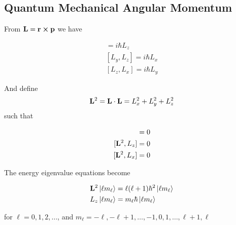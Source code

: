 \documentclass{article}
\begin{document}
\subsection{Quantum Mechanical Angular Momentum}
From $\vb{L} = \vb{r} \cross \vb{p}$ we have
\begin{center}
\begin{align*}
    [L_x, L_y] = i\hbar L_z \\ 
    [L_y, L_z] = i\hbar L_x \\ 
    [L_z, L_x] = i\hbar L_y 
\end{align*}
\end{center}
And define 
$$
\vb{L}^2 = \vb{L} \cdot \vb{L} = L_x^2 + L_y^2 + L_z^2
$$
such that
\begin{center}
\begin{align*}
    [\vb{L}^2, L_y] = 0 \\ 
    [\vb{L}^2, L_z] = 0 \\ 
    [\vb{L}^2, L_x] = 0 
\end{align*}
\end{center}
The energy eigenvalue equations become
\begin{center}
\begin{align*}
\vb{L}^2 \ket{\ell m_{\ell}} & =  \ell ( \ell + 1) \hbar^2 \ket{\ell m_{\ell}} \\
L_z \ket{\ell m_{\ell}} & = m_{\ell} \hbar \ket{\ell m_{\ell}} 
\end{align*}
\end{center}

for $\ell = 0, 1, 2, \dots$, and  $m_{\ell} = -\ell, -\ell + 1, \dots, -1, 0, 1, \dots, \ell + 1, \ell$
\end{document}

